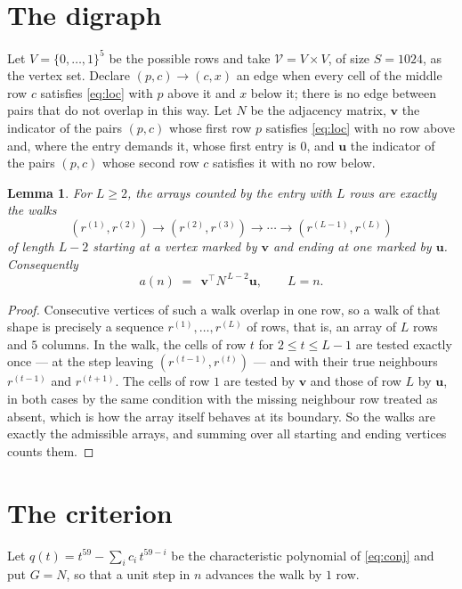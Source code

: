 \documentclass[11pt,a4paper]{article}
\theoremstyle{plain}
\newtheorem{lemma}[theorem]{Lemma}
\theoremstyle{definition}
\begin{document}
\section{The digraph}

Let $V=\{0,\dots,1\}^{5}$ be the possible rows and take
$\mathcal V=V\times V$, of size $S=1024$, as the vertex set. Declare $(p,c)\to(c,x)$ an edge
when every cell of the middle row $c$ satisfies \eqref{eq:loc} with $p$ above it and $x$
below it; there is no edge between pairs that do not overlap in this way. Let $N$ be the
adjacency matrix, $\mathbf{v}$ the indicator of the pairs $(p,c)$ whose first row $p$
satisfies \eqref{eq:loc} with no row above and, where the entry demands it, whose first entry is $0$, and $\mathbf{u}$ the indicator of
the pairs $(p,c)$ whose second row $c$ satisfies it with no row below.

\begin{lemma}\label{lem:walk}
For $L\ge2$, the arrays counted by the entry with $L$ rows are exactly the walks
\[
(r^{(1)},r^{(2)})\to(r^{(2)},r^{(3)})\to\cdots\to(r^{(L-1)},r^{(L)})
\]
of length $L-2$ starting at a vertex marked by $\mathbf{v}$ and ending at one marked by
$\mathbf{u}$. Consequently
\[
a(n)\;=\;\,\mathbf{v}^{\!\top}N^{\,L-2}\mathbf{u},\qquad L=n .
\]
\end{lemma}

\begin{proof}
Consecutive vertices of such a walk overlap in one row, so a walk of that shape is
precisely a sequence $r^{(1)},\dots,r^{(L)}$ of rows, that is, an array of $L$ rows
and $5$ columns. In the walk, the cells of row $t$ for $2\le t\le L-1$ are tested
exactly once --- at the step leaving $(r^{(t-1)},r^{(t)})$ --- and with their true
neighbours $r^{(t-1)}$ and $r^{(t+1)}$. The cells of row $1$ are tested by
$\mathbf{v}$ and those of row $L$ by $\mathbf{u}$, in both cases by the same condition
with the missing neighbour row treated as absent, which is how the array itself behaves at
its boundary. So the walks are exactly the admissible arrays, and summing over all starting
and ending vertices counts them.
\end{proof}

\section{The criterion}

Let $q(t)=t^{59}-\sum_i c_i\,t^{59-i}$ be the characteristic polynomial of
\eqref{eq:conj} and put $G=N$, so that a unit step in $n$ advances the walk by
$1$ row.
\end{document}
